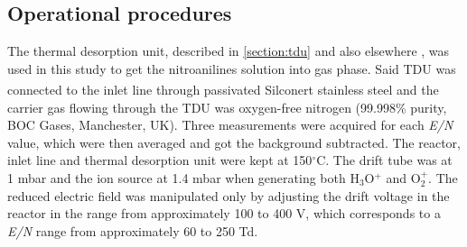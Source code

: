 \subsection{Operational procedures}
The thermal desorption unit, described in \autoref{section:tdu} and also elsewhere \cite{RN445}, was used in this study to get the nitroanilines solution into gas phase. Said TDU was connected to the inlet line through passivated Silconert\textsuperscript{\textregistered} stainless steel and the carrier gas flowing through the TDU was oxygen-free nitrogen (99.998\% purity, BOC Gases, Manchester, UK). 
Three measurements were acquired for each \textit{E/N} value, which were then averaged and got the background subtracted. 
The reactor, inlet line and thermal desorption unit were kept at 150$^{\circ}$C. The drift tube was at 1 mbar and the ion source at 1.4 mbar when generating both H$_3$O$^+$ and O$_2^+$.
The reduced electric field was manipulated only by adjusting the drift voltage in the reactor in the range from approximately 100 to 400 V, which corresponds to a \textit{E/N} range from approximately 60 to 250 Td.



